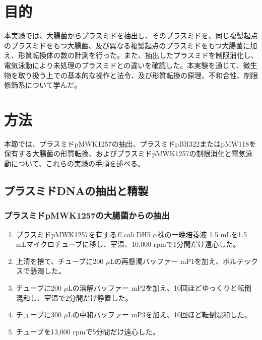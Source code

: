 \documentclass[paper=a4, head_space=20mm, foot_space=25mm]{jlreq}
\begin{document}
    
    
    \section{目的}
        本実験では、大腸菌からプラスミドを抽出し、そのプラスミドを、同じ複製起点のプラスミドをもつ大腸菌、及び異なる複製起点のプラスミドをもつ大腸菌に加え、形質転換体の数の計測を行った。また、抽出したプラスミドを制限消化し、電気泳動により未処理のプラスミドとの違いを確認した。本実験を通じて、微生物を取り扱う上での基本的な操作と法令、及び形質転換の原理、不和合性、制限修飾系について学んだ。

    \section{方法}
        本節では、プラスミドpMWK1257の抽出、プラスミドpBR322またはpMW118を保有する大腸菌の形質転換、およびプラスミドpMWK1257の制限消化と電気泳動について、これらの実験の手順を述べる。

        \subsection{プラスミドDNAの抽出と精製}
            \subsubsection*{プラスミドpMWK1257の大腸菌からの抽出}
                \begin{enumerate}
                    \item プラスミドpMWK1257を有する\textit{E.coli} DH5 $\alpha$株の一晩培養液 1.5 mLを1.5 mLマイクロチューブに移し、室温、10,000 rpmで1分間だけ遠心した。
                    \item 上清を捨て、チューブに200 $\mu$Lの再懸濁バッファー mP1を加え、ボルテックスで懸濁した。
                    \item チューブに200 $\mu$Lの溶解バッファー mP2を加え、10回ほどゆっくりと転倒混和し、室温で2分間だけ静置した。
                    \item チューブに300 $\mu$Lの中和バッファー mP3を加え、10回ほど転倒混和した。
                    \item チューブを13,000 rpmで5分間だけ遠心した。
                \end{enumerate}
            
\end{document}
